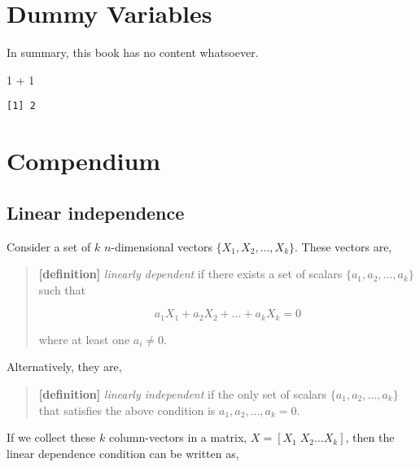 \documentclass[
  letterpaper,
  DIV=11,
  numbers=noendperiod]{scrreprt}
\newenvironment{Shaded}{\begin{snugshade}}{\end{snugshade}}
\newcommand{\DecValTok}[1]{\textcolor[rgb]{0.68,0.00,0.00}{#1}}
\newcommand{\SpecialCharTok}[1]{\textcolor[rgb]{0.37,0.37,0.37}{#1}}
\begin{document}

\hypertarget{sec-dummy}{%
\chapter{Dummy Variables}\label{sec-dummy}}

In summary, this book has no content whatsoever.

\begin{Shaded}
\begin{Highlighting}[]
\DecValTok{1} \SpecialCharTok{+} \DecValTok{1}
\end{Highlighting}
\end{Shaded}

\begin{verbatim}
[1] 2
\end{verbatim}


\hypertarget{sec-compendium}{%
\chapter{Compendium}\label{sec-compendium}}

\hypertarget{linear-independence}{%
\section{Linear independence}\label{linear-independence}}

Consider a set of \(k\) \(n\)-dimensional vectors
\(\{X_{1},X_{2},...,X_{k}\}\). These vectors are,

\begin{quote}
\textbf{{[}definition{]}} \emph{linearly dependent} if there exists a
set of scalars \(\{a_{1},a_{2},\dots,a_{k}\}\) such that

\[
a_1X_1 + a_2X_2+\ldots+a_kX_k=0
\]

where at least one \(a_i\neq0\).
\end{quote}

Alternatively, they are,

\begin{quote}
\textbf{{[}definition{]}} \emph{linearly independent} if the only set of
scalars \(\{a_{1},a_{2},\dots,a_{k}\}\) that satisfies the above
condition is \(a_1,a_2,\dots,a_k=0\).
\end{quote}

If we collect these \(k\) column-vectors in a matrix,
\(X=[X_1\;X_2 \dots X_k]\), then the linear dependence condition can be
written as,
\end{document}
